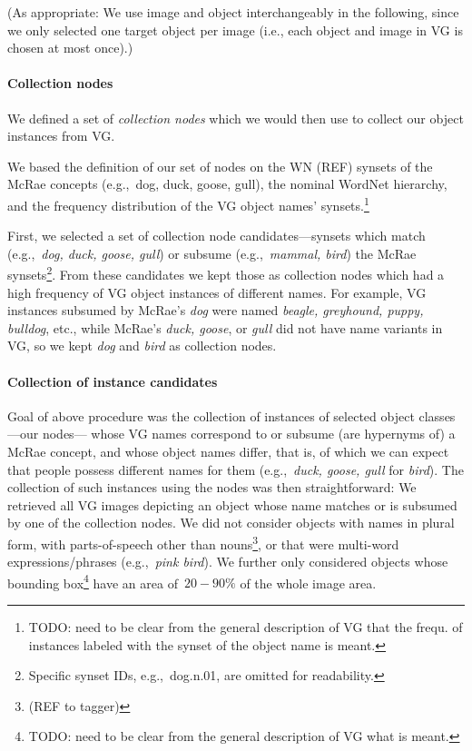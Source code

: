 (As appropriate: We use image and object interchangeably in the following, since we only selected one target object per image (i.e., each object and image in VG is chosen at most once).)

\paragraph{Collection nodes}
We defined a set of \textit{collection nodes} which we would then use to collect our object instances from VG. 

We based the definition of our set of nodes on the WN (REF) synsets of the McRae concepts (e.g.,~dog, duck, goose, gull), the nominal WordNet hierarchy, and the frequency distribution of the VG object names' synsets.\footnote{TODO: need to be clear from the general description of VG that the frequ. of instances labeled with the synset of the object name is meant.} 

First, we selected a set of collection node candidates---synsets which match (e.g.,~\textsl{dog, duck, goose, gull}) or subsume (e.g.,~\textsl{mammal, bird}) the McRae synsets\footnote{Specific synset IDs, e.g.,~dog.n.01, are omitted for readability.}. 
From these candidates we kept those as collection nodes which had a high frequency of VG object instances of different names. For example, VG instances  subsumed by McRae's \textsl{dog} were named \textsl{beagle, greyhound, puppy, bulldog}, etc., while McRae's \textsl{duck, goose}, or \textsl{gull} did not have name variants in VG, so we kept \textsl{dog} and \textsl{bird} as collection nodes.

\paragraph{Collection of instance candidates}
Goal of above procedure was the collection of instances of selected object classes---our nodes--- whose VG names correspond to or subsume (are hypernyms of) a McRae concept, and whose object names differ, that is, of which we can expect that people possess different names for them (e.g.,~\textsl{duck, goose, gull} for \textsl{bird}).
The collection of such instances using the nodes was then straightforward: We retrieved all VG images  depicting an object whose name matches or is subsumed by one of the collection nodes. 
We did not consider objects with names in plural form, with parts-of-speech other than nouns\footnote{(REF to tagger)}, or that were multi-word expressions/phrases (e.g.,~\textsl{pink bird}). 
We further only considered objects whose bounding box\footnote{TODO: need to be clear from the general description of VG what is meant.} have an area of~$20-90\%$ of the whole image area.


